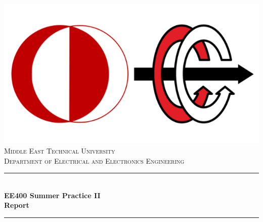 \begin{titlepage}

\newcommand{\HRule}{\rule{\linewidth}{0.5mm}} %

\center %

\includegraphics[scale=0.3]{odtuee.png}\\[1cm]
 

 


\textsc{\LARGE Middle East Technical University}\\[1.5cm] %
\textsc{\Large Department of Electrical and Electronics Engineering }\\[0.5cm] %


\HRule \\[0.4cm]

{ \huge \bfseries \large EE400 Summer Practice II \\ Report}\\[0cm] %
\HRule \\[1cm]
 

\end{titlepage}
